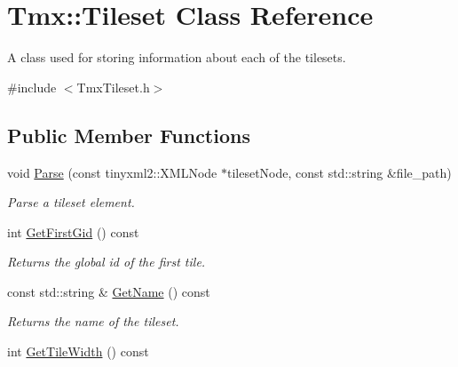 \hypertarget{classTmx_1_1Tileset}{\section{Tmx\-:\-:Tileset Class Reference}
\label{classTmx_1_1Tileset}
}


A class used for storing information about each of the tilesets.  




{\ttfamily \#include $<$Tmx\-Tileset.\-h$>$}

\subsection*{Public Member Functions}
\begin{DoxyCompactItemize}
\item 
\hypertarget{classTmx_1_1Tileset_a221d83fe8974273d5ae449781a72eda7}{void \hyperlink{classTmx_1_1Tileset_a221d83fe8974273d5ae449781a72eda7}{Parse} (const tinyxml2\-::\-X\-M\-L\-Node $\ast$tileset\-Node, const std\-::string \&file\-\_\-path)}\label{classTmx_1_1Tileset_a221d83fe8974273d5ae449781a72eda7}

\begin{DoxyCompactList}\small\item\em Parse a tileset element. \end{DoxyCompactList}\item 
\hypertarget{classTmx_1_1Tileset_a8fffad2d93e4940d8207a391defcab9d}{int \hyperlink{classTmx_1_1Tileset_a8fffad2d93e4940d8207a391defcab9d}{Get\-First\-Gid} () const }\label{classTmx_1_1Tileset_a8fffad2d93e4940d8207a391defcab9d}

\begin{DoxyCompactList}\small\item\em Returns the global id of the first tile. \end{DoxyCompactList}\item 
\hypertarget{classTmx_1_1Tileset_a6aaa5c91cdbe2bcb6959067c64be907f}{const std\-::string \& \hyperlink{classTmx_1_1Tileset_a6aaa5c91cdbe2bcb6959067c64be907f}{Get\-Name} () const }\label{classTmx_1_1Tileset_a6aaa5c91cdbe2bcb6959067c64be907f}

\begin{DoxyCompactList}\small\item\em Returns the name of the tileset. \end{DoxyCompactList}\item 
\hypertarget{classTmx_1_1Tileset_a3ebb60d5b3f4a64135c6c9d4a20a1ec4}{int \hyperlink{classTmx_1_1Tileset_a3ebb60d5b3f4a64135c6c9d4a20a1ec4}{Get\-Tile\-Width} () const }\label{classTmx_1_1Tileset_a3ebb60d5b3f4a64135c6c9d4a20a1ec4}


\end{DoxyCompactItemize}
